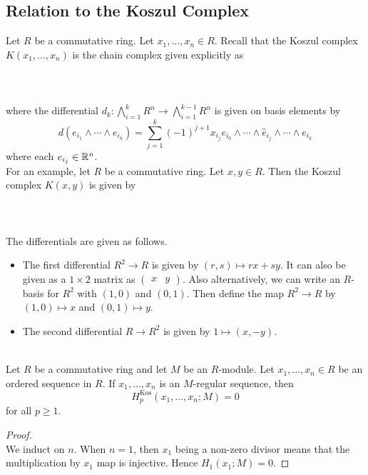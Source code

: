 \documentclass[a4paper]{article}
\begin{document}
\subsection{Relation to the Koszul Complex}
Let $R$ be a commutative ring. Let $x_1,\dots,x_n\in R$. Recall that the Koszul complex $K(x_1,\dots,x_n)$ is the chain complex given explicitly as \\~\\
\\~\\
where the differential $d_k:\bigwedge_{i=1}^kR^n\to\bigwedge_{i=1}^{k-1}R^n$ is given on basis elements by $$d(e_{i_1}\wedge\cdots\wedge e_{i_k})=\sum_{j=1}^k(-1)^{j+1}x_{i_j}e_{i_0}\wedge\cdots\wedge\hat{e}_{i_j}\wedge\cdots\wedge e_{i_k}$$ where each $e_{i_j}\in\mathbb{R}^n$. \\

For an example, let $R$ be a commutative ring. Let $x,y\in R$. Then the Koszul complex $K(x,y)$ is given by \\~\\
\\~\\
The differentials are given as follows. 
\begin{itemize}
\item The first differential $R^2\to R$ is given by $(r,s)\mapsto rx+sy$. It can also be given as a $1\times 2$ matrix as $\begin{pmatrix}x & y\end{pmatrix}$. Also alternatively, we can write an $R$-basis for $R^2$ with $(1,0)$ and $(0,1)$. Then define the map $R^2\to R$ by $(1,0)\mapsto x$ and $(0,1)\mapsto y$. 
\item The second differential $R\to R^2$ is given by $1\mapsto(x,-y)$. 
\end{itemize}

\begin{prp}{}{}\\
Let $R$ be a commutative ring and let $M$ be an $R$-module. Let $x_1,\dots,x_n\in R$ be an ordered sequence in $R$. If $x_1,\dots,x_n$ is an $M$-regular sequence, then $$H_p^\text{Kos}(x_1,\dots,x_n;M)=0$$ for all $p\geq 1$. 
\begin{proof}\\
We induct on $n$. When $n=1$, then $x_1$ being a non-zero divisor means that the multiplication by $x_1$ map is injective. Hence $H_1(x_1;M)=0$. 
\end{proof}
\end{prp}
\end{document}
